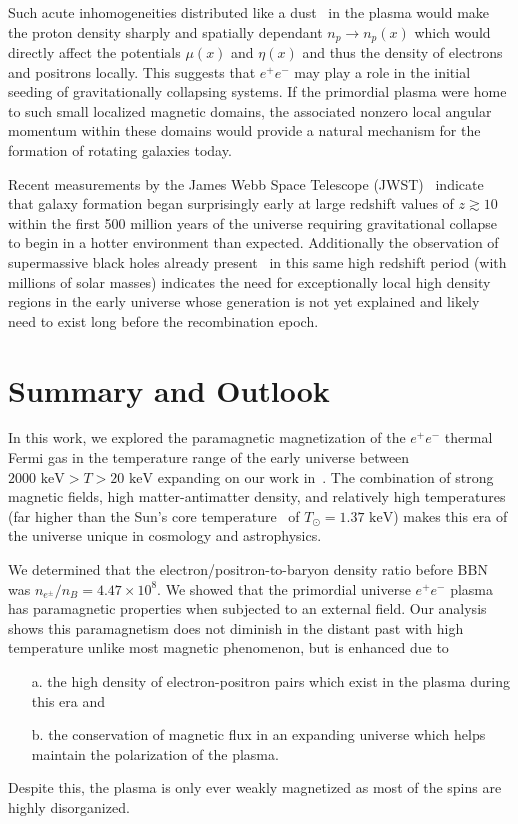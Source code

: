 \documentclass[aps,prd,floatfix,reprint]{revtex4-2}
\newcommand*{\keV}{\text{ keV}}
\begin{document}
Such acute inhomogeneities distributed like a dust~\cite{Grayson:2023flr} in the plasma would make the proton density sharply and spatially dependant $n_{p}\rightarrow n_{p}(x)$ which would directly affect the potentials $\mu(x)$ and $\eta(x)$ and thus the density of electrons and positrons locally. This suggests that $e^{+}e^{-}$ may play a role in the initial seeding of gravitationally collapsing systems. If the primordial plasma were home to such small localized magnetic domains, the associated nonzero local angular momentum within these domains would provide a natural mechanism for the formation of rotating galaxies today.

Recent measurements by the James Webb Space Telescope (JWST)~\cite{Yan:2022sxd,adams2023discovery,arrabal2023spectroscopic} indicate that galaxy formation began surprisingly early at large redshift values of $z\gtrsim10$ within the first 500 million years of the universe requiring gravitational collapse to begin in a hotter environment than expected. Additionally the observation of supermassive black holes already present~\cite{CEERSTeam:2023qgy} in this same high redshift period (with millions of solar masses) indicates the need for exceptionally local high density regions in the early universe whose generation is not yet explained and likely need to exist long before the recombination epoch.

\section{Summary and Outlook}
\label{sec:conclusions}
\noindent In this work, we explored the paramagnetic magnetization of the $e^{+}e^{-}$ thermal Fermi gas in the temperature range of the early universe between $2000\keV>T>20\keV$ expanding on our work in~\cite{Rafelski:2023emw}. The combination of strong magnetic fields, high matter-antimatter density, and relatively high temperatures (far higher than the Sun's core temperature~\cite{Bahcall:2000nu} of $T_{\odot}=1.37\keV$) makes this era of the universe unique in cosmology and astrophysics.

We determined that the electron/positron-to-baryon density ratio before BBN was $n_{e^{\pm}}/n_{B}=4.47\times10^{8}$. We showed that the primordial universe $e^{+}e^{-}$ plasma has paramagnetic properties when subjected to an external field. Our analysis shows this paramagnetism does not diminish in the distant past with high temperature unlike most magnetic phenomenon, but is enhanced due to
\begin{itemize}
 \item[a.] the high density of electron-positron pairs which exist in the plasma during this era and
 \item[b.] the conservation of magnetic flux in an expanding universe which helps maintain the polarization of the plasma.
\end{itemize}
Despite this, the plasma is only ever weakly magnetized as most of the spins are highly disorganized.
\end{document}
